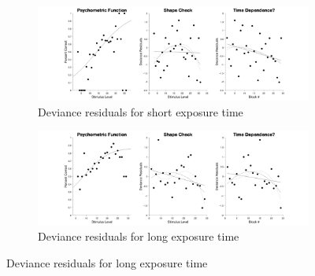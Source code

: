 \documentclass{article}
\begin{document}
\begin{figure}[!hb]
    \begin{subfigure}{\textwidth}
        \centering
        \includegraphics[width = \linewidth]{Thesis/plots/gof/segSize/segSize_go_short_deviance.png}
        \caption{Deviance residuals for short exposure time}
    \end{subfigure}
    
    \begin{subfigure}{\textwidth}
        \centering
        \includegraphics[width = \linewidth]{Thesis/plots/gof/segSize/segSize_go_long_deviance.png}
        \caption{Deviance residuals for long exposure time}
    \end{subfigure}
    
\end{figure}
\clearpage
\end{document}
